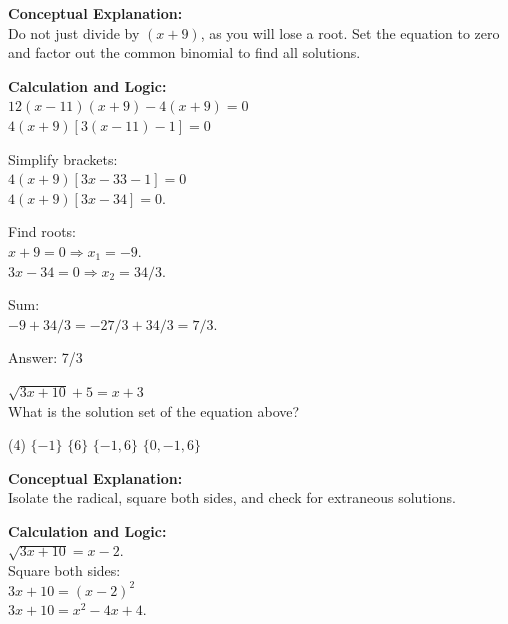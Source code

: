 \documentclass[11pt,paper=a4,answers]{exam}
\begin{document}
\begin{questions}
\begin{solution}
\textbf{Conceptual Explanation:} \\
Do not just divide by $(x+9)$, as you will lose a root. Set the equation to zero and factor out the common binomial to find all solutions.

\vspace{20pt}

\textbf{Calculation and Logic:} \\
$12(x - 11)(x + 9) - 4(x + 9) = 0$ \\
$4(x + 9) [3(x - 11) - 1] = 0$

\vspace{10pt}

Simplify brackets: \\
$4(x + 9) [3x - 33 - 1] = 0$ \\
$4(x + 9) [3x - 34] = 0$.

\vspace{10pt}

Find roots: \\
$x + 9 = 0 \Rightarrow x_1 = -9$. \\
$3x - 34 = 0 \Rightarrow x_2 = 34/3$.

\vspace{10pt}

Sum: \\
$-9 + 34/3 = -27/3 + 34/3 = 7/3$.

\vspace{25pt}

Answer: \colorbox{yellow!100}{7/3}
\end{solution}

\vspace{40pt}

\question
$\sqrt{3x+10} + 5 = x + 3$ \\
What is the solution set of the equation above?
\begin{tasks}(4)
    \task $\{-1\}$
    \task $\{6\}$
    \task $\{-1, 6\}$
    \task $\{0, -1, 6\}$
\end{tasks}

\begin{solution}
\textbf{Conceptual Explanation:} \\
Isolate the radical, square both sides, and check for extraneous solutions.

\vspace{20pt}

\textbf{Calculation and Logic:} \\
$\sqrt{3x+10} = x - 2$. \\
Square both sides: \\
$3x + 10 = (x - 2)^2$ \\
$3x + 10 = x^2 - 4x + 4$.


\end{solution}
\end{questions}
\end{document}
